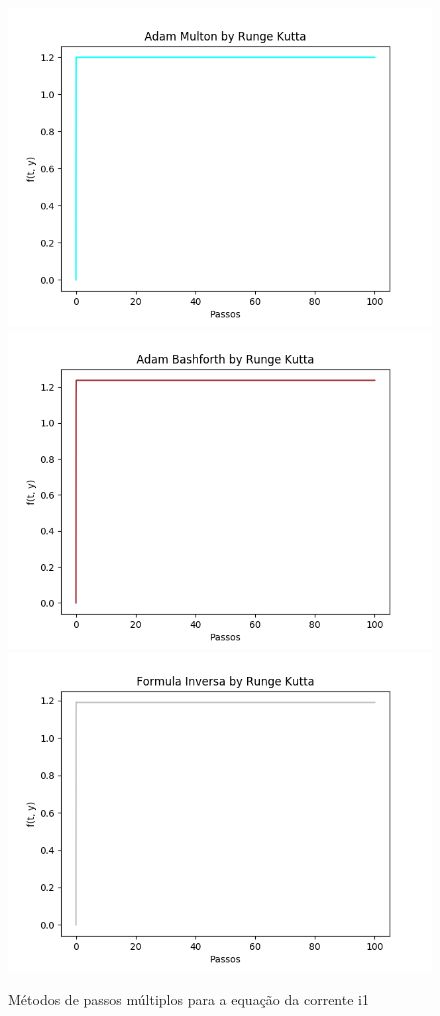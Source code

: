 \documentclass[12pt]{article}%
\begin{document}
    \begin{figure}[H]
        \begin{center}
            \includegraphics[width=.4\textwidth]{problemas/metodos_q2/circuito_multon.png}
            \includegraphics[width=.4\textwidth]{problemas/metodos_q2/circuito_bashforth.png}
            \includegraphics[width=.4\textwidth]{problemas/metodos_q2/circuito_inversa.png}
        \end{center}
        \caption{Métodos de passos múltiplos para a equação da corrente i1}
    \end{figure}
\end{document}
